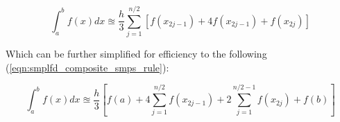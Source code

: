 \documentclass{paper}
\begin{document}
\begin{equation}
    \label{eqn:composite_smps_rule}
    \int_a^b f(x) dx \approxeq \dfrac{h}{3} \sum_{j=1}^{n / 2} [f(x_{2j-1}) + 4f(x_{2j-1}) + f(x_{2j})]
\end{equation}

Which can be further simplified for efficiency to the following (\ref{eqn:smplfd_composite_smps_rule}):

\begin{equation}
    \label{eqn:smplfd_composite_smps_rule}
    \int_a^b f(x) dx \approxeq \dfrac{h}{3} [f(a) + 4 \sum_{j=1}^{n / 2} f(x_{2j-1}) + 2  \sum_{j=1}^{n / 2 - 1} f(x_{2j}) + f(b)]
\end{equation}
\end{document}
